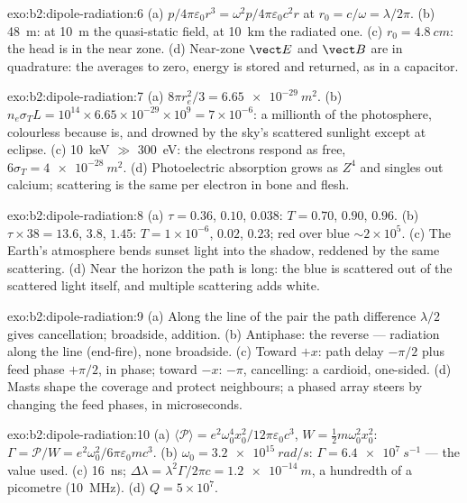 \begin{solution}{exo:b2:dipole-radiation:6}
(a) $p/4\pi\varepsilon_0r^3 = \omega^2p/4\pi\varepsilon_0c^2r$ at $r_0 = c/\omega = \lambda/2\pi$. (b) \qty{48}{m}:
at \qty{10}{m} the quasi-static field, at \qty{10}{km} the radiated one. (c)
$r_0 = \qty{4.8}{cm}$: the head is in the near zone. (d) Near-zone $\vect E$
and $\vect B$ are in quadrature: the  averages to zero,
energy is stored and returned, as in a capacitor.
\end{solution}

\begin{solution}{exo:b2:dipole-radiation:7}
(a) $8\pi r_e^2/3 = \qty{6.65e-29}{m^2}$. (b) $n_e\sigma_TL = 10^{14} \times 6.65 \times 10^{-29}
\times 10^9 = 7 \times 10^{-6}$: a millionth of the photosphere, colourless because
 is, and drowned by the sky's scattered sunlight
except at eclipse. (c) \qty{10}{keV} $\gg$ \qty{300}{eV}: the electrons respond as
free, $6\sigma_T = \qty{4e-28}{m^2}$. (d) Photoelectric absorption grows as $Z^4$
and singles out calcium; scattering is the same per electron in bone
and flesh.
\end{solution}

\begin{solution}{exo:b2:dipole-radiation:8}
(a) $\tau = 0.36$, $0.10$, $0.038$: $T = 0.70$, $0.90$, $0.96$. (b) $\tau \times 38 = 13.6$,
$3.8$, $1.45$: $T = 1 \times 10^{-6}$, $0.02$, $0.23$; red over blue $\sim 2 \times 10^5$. (c)
The Earth's atmosphere bends sunset light into the shadow, reddened
by the same scattering. (d) Near the horizon the path is long: the
blue is scattered out of the scattered light itself, and multiple
scattering adds white.
\end{solution}

\begin{solution}{exo:b2:dipole-radiation:9}
(a) Along the line of the pair the path difference $\lambda/2$ gives
cancellation; broadside, addition. (b) Antiphase: the reverse ---
radiation along the line (end-fire), none broadside. (c) Toward $+x$:
path delay $-\pi/2$ plus feed phase $+\pi/2$, in phase; toward $-x$:
$-\pi$, cancelling: a cardioid, one-sided. (d) Masts shape the coverage
and protect neighbours; a phased array steers by changing the feed
phases, in microseconds.
\end{solution}

\begin{solution}{exo:b2:dipole-radiation:10}
(a) $\langle\mathcal P\rangle = e^2\omega_0^4x_0^2/12\pi\varepsilon_0c^3$, $W = \tfrac12m\omega_0^2x_0^2$:
$\Gamma = \mathcal P/W = e^2\omega_0^2/6\pi\varepsilon_0mc^3$. (b) $\omega_0 = \qty{3.2e15}{rad/s}$: $\Gamma =
\qty{6.4e7}{s^{-1}}$ --- the value used. (c) \qty{16}{ns}; $\Delta\lambda = \lambda^2\Gamma/2\pi c =
\qty{1.2e-14}{m}$, a hundredth of a picometre (\qty{10}{MHz}). (d) $Q = 5 \times 10^7$.
\end{solution}

